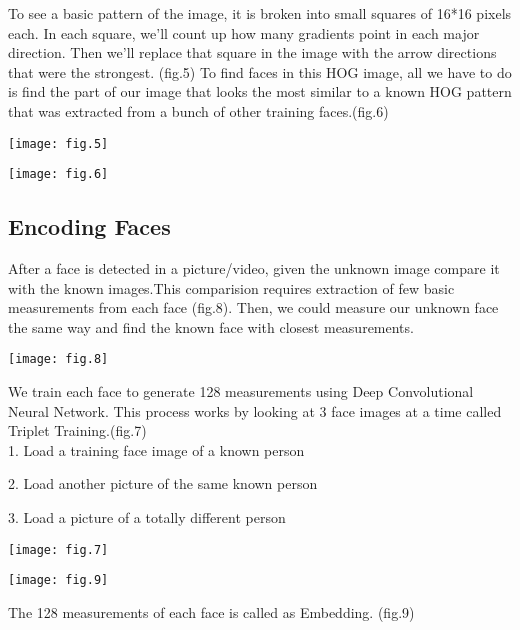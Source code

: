 \documentclass[12pt]{report}
\begin{document}
To see a basic pattern of the image, it is broken into small squares of 16*16 pixels each. In each square, we’ll count up how many gradients point in each major direction. Then we’ll replace that square in the image with the arrow directions that were the strongest. (fig.5) To find faces in this HOG image, all we have to do is find the part of our image that looks the most similar to a known HOG pattern that was extracted from a bunch of other training faces.(fig.6)
\begin{center}
\begin{minipage}{0.49\linewidth}
\texttt{[image: fig.5]}
\end{minipage}%
\hfill
\begin{minipage}{0.49\linewidth}
\texttt{[image: fig.6]}
\end{minipage}
\end{center}

\subsection{Encoding Faces}
After a face is detected in a picture/video, given the unknown image compare it with the known images.This comparision requires extraction of few basic measurements from each face (fig.8). Then, we could measure our unknown face the same way and find the known face with closest measurements.\\
\begin{center}
\begin{minipage}{0.49\linewidth}
\texttt{[image: fig.8]}
\end{minipage}
\end{center}
We train each face to generate 128 measurements using Deep Convolutional Neural Network. This process works by looking at 3 face images at a time called Triplet Training.(fig.7)\\

1.	Load a training face image of a known person

2.	Load another picture of the same known person

3.	Load a picture of a totally different person\\
\begin{center}
\begin{minipage}{0.49\linewidth}
\texttt{[image: fig.7]}
\end{minipage}
\end{center}
\begin{center}
\begin{minipage}{0.49\linewidth}
\texttt{[image: fig.9]}
\end{minipage}
\end{center}
The 128 measurements of each face is called as Embedding. (fig.9)
\end{document}
